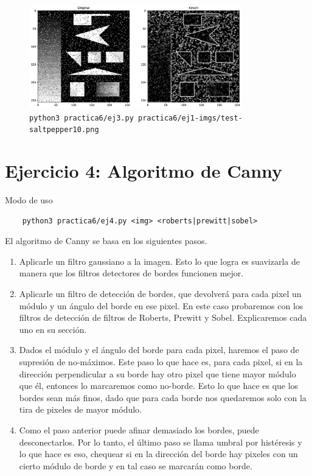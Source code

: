 \documentclass[11pt, spanish]{article}
\begin{document}
\begin{figure}[H]
\centering
    \includegraphics[height=4.5cm]{informe-imgs/ej3--test-saltpepper10.jpg}
    \caption{\texttt{python3 practica6/ej3.py practica6/ej1-imgs/test-saltpepper10.png }}
\end{figure}

\newpage
\section{Ejercicio 4: Algoritmo de Canny}

Modo de uso
\begin{verbatim}
    python3 practica6/ej4.py <img> <roberts|prewitt|sobel>
\end{verbatim}

El algoritmo de Canny se basa en los siguientes pasos.

\begin{enumerate}
\item Aplicarle un filtro gaussiano a la imagen. Esto lo que logra es suavizarla de manera que los filtros detectores de bordes funcionen mejor.
\item Aplicarle un filtro de detección de bordes, que devolverá para cada pixel un módulo y un ángulo del borde en ese pixel. En este caso probaremos con los filtros de detección de filtros de Roberts, Prewitt y Sobel. Explicaremos cada uno en su sección.
\item Dados el módulo y el ángulo del borde para cada pixel, haremos el paso de supresión de no-máximos. Este paso lo que hace es, para cada pixel, si en la dirección perpendicular a su borde hay otro pixel que tiene mayor módulo que él, entonces lo marcaremos como no-borde.
Esto lo que hace es que los bordes sean más finos, dado que para cada borde nos quedaremos solo con la tira de pixeles de mayor módulo.
\item Como el paso anterior puede afinar demasiado los bordes, puede desconectarlos. Por lo tanto, el último paso se llama umbral por histéresis y lo que hace es eso, chequear si en la dirección del borde hay pixeles con un cierto módulo de borde y en tal caso se marcarán como borde.
\end{enumerate}
\end{document}
